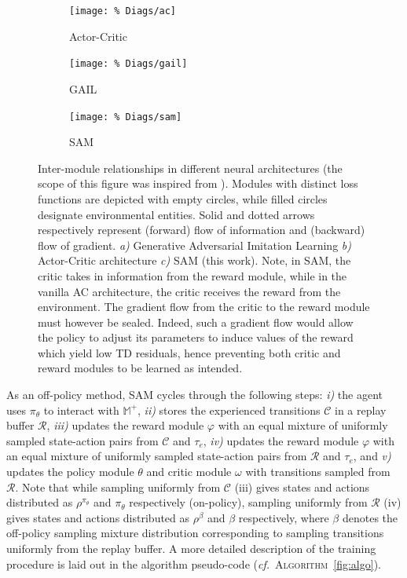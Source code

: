 \begin{figure}[!h]
\centering
\begin{subfigure}[t]{0.27\textwidth}
\centering
\texttt{[image: \%
Diags/ac]}
\caption{Actor-Critic \cite{Sutton1999-ii}}
\end{subfigure}
\begin{subfigure}[t]{0.27\textwidth}
\centering
\texttt{[image: \%
Diags/gail]}
\caption{GAIL \cite{Ho2016-bv}}
\end{subfigure}
\begin{subfigure}[t]{0.37\textwidth}
\centering
\texttt{[image: \%
Diags/sam]}
\caption{SAM \cite{Blonde2019-vc}}
\end{subfigure}
\caption{Inter-module relationships in different neural architectures
(the scope of this figure was inspired from \cite{Pfau2016-ft}).
Modules with distinct loss functions are depicted with empty circles, while
filled circles designate environmental entities.
Solid and dotted arrows respectively represent
(forward) flow of information
and
(backward) flow of gradient.
\textit{a)}
Generative Adversarial Imitation Learning \cite{Ho2016-bv}
\textit{b)}
Actor-Critic architecture \cite{Sutton1999-ii}
\textit{c)}
SAM (this work).
Note, in SAM, the critic takes in information from the reward
module, while in the vanilla AC architecture, the critic receives the
reward from the environment.
The gradient flow from the critic to the reward module must however
be sealed.
Indeed, such
a gradient flow would allow the policy to adjust its parameters to induce
values of the reward which yield low TD residuals, hence preventing both
critic and reward modules to be learned as intended.}
\label{fig:diags}
\end{figure}

As an off-policy method, SAM cycles through the following steps:
\textit{i)} the agent uses $\pi_\theta$ to interact with $\mathbb{M}^+$,
\textit{ii)} stores the experienced transitions $\mathcal{C}$ in a replay buffer $\mathcal{R}$,
\textit{iii)} updates the reward module $\varphi$ with an equal mixture of uniformly sampled
state-action pairs
from $\mathcal{C}$ and $\tau_e$,
\textit{iv)} updates the reward module $\varphi$ with an equal mixture of uniformly sampled
state-action pairs
from $\mathcal{R}$ and $\tau_e$, and
\textit{v)} updates the policy module $\theta$ and critic module $\omega$
with transitions sampled from $\mathcal{R}$.
Note that while sampling uniformly from $\mathcal{C}$ (iii) gives
states and actions distributed as $\rho^{\pi_\theta}$ and $\pi_\theta$ respectively
(on-policy),
sampling uniformly from $\mathcal{R}$ (iv) gives
states and actions distributed as $\rho^\beta$ and $\beta$ respectively,
where $\beta$ denotes the off-policy sampling mixture distribution
corresponding to sampling transitions uniformly from the replay buffer.
A more detailed description of the training procedure is laid out in the
algorithm pseudo-code (\textit{cf.}~\textsc{Algorithm}~\ref{fig:algo}).

